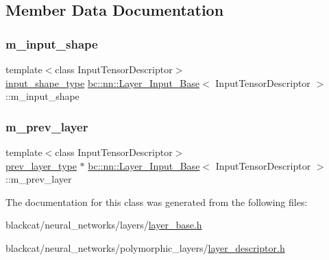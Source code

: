 \subsection{Member Data Documentation}
\mbox{\label{classbc_1_1nn_1_1Layer__Input__Base_a62e4c2be3ab87af2b1e0a963f058241a}} 
\subsubsection{\texorpdfstring{m\+\_\+input\+\_\+shape}{m\_input\_shape}}
{\footnotesize\ttfamily template$<$class Input\+Tensor\+Descriptor$>$ \\
\hyperlink{structbc_1_1Dim}{input\+\_\+shape\+\_\+type} \hyperlink{classbc_1_1nn_1_1Layer__Input__Base}{bc\+::nn\+::\+Layer\+\_\+\+Input\+\_\+\+Base}$<$ Input\+Tensor\+Descriptor $>$\+::m\+\_\+input\+\_\+shape\hspace{0.3cm}{\ttfamily [protected]}}

\mbox{\label{classbc_1_1nn_1_1Layer__Input__Base_a7953ac2f759d65d19f514c74b0b36933}} 
\subsubsection{\texorpdfstring{m\+\_\+prev\+\_\+layer}{m\_prev\_layer}}
{\footnotesize\ttfamily template$<$class Input\+Tensor\+Descriptor$>$ \\
\hyperlink{structbc_1_1nn_1_1Layer__Output__Base}{prev\+\_\+layer\+\_\+type} $\ast$ \hyperlink{classbc_1_1nn_1_1Layer__Input__Base}{bc\+::nn\+::\+Layer\+\_\+\+Input\+\_\+\+Base}$<$ Input\+Tensor\+Descriptor $>$\+::m\+\_\+prev\+\_\+layer\hspace{0.3cm}{\ttfamily [protected]}}



The documentation for this class was generated from the following files\+:\begin{DoxyCompactItemize}
\item 
blackcat/neural\+\_\+networks/layers/\hyperlink{layer__base_8h}{layer\+\_\+base.\+h}\item 
blackcat/neural\+\_\+networks/polymorphic\+\_\+layers/\hyperlink{layer__descriptor_8h}{layer\+\_\+descriptor.\+h}\end{DoxyCompactItemize}
